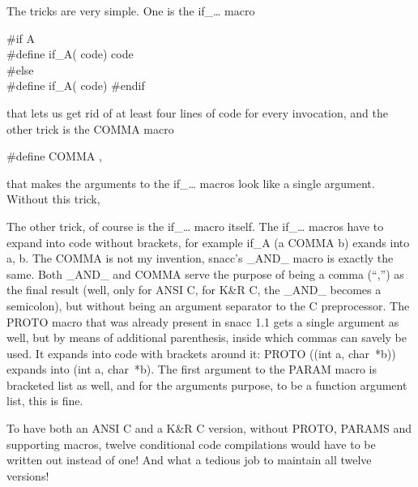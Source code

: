 The tricks are very simple.
One is the {\C if\_\dots} macro

\begin{Ccode}
\#if A\\
\#define if\_A( code)			\>\>\>code\\
\#else\\
\#define if\_A( code)
\#endif
\end{Ccode}

that lets us get rid of at least four lines of code for every invocation, and the other trick is the {\C COMMA} macro

\begin{Ccode}
\#define COMMA \>\>\>,
\end{Ccode}

that makes the arguments to the {\C if\_\dots{}} macros look like a single argument.
Without this trick, 

The other trick, of course is the {\C if\_\dots{}} macro itself.
The {\C if\_\dots{}} macros have to expand into code without brackets, for example {\C if\_A (a COMMA b)} exands into {\C a, b}.
The {\C COMMA} is not my invention, snacc's {\C \_AND\_} macro is exactly the same.
Both {\C \_AND\_} and {\C COMMA} serve the purpose of being a comma (``,'') as the final result (well, only for ANSI C, for K\&R C, the {\C \_AND\_} becomes a semicolon), but without being an argument separator to the C preprocessor.
The {\C PROTO} macro that was already present in snacc 1.1 gets a single argument as well, but by means of additional parenthesis, inside which commas can savely be used.
It expands into code with brackets around it: {\C PROTO ((int a, char~*b))} expands into {\C (int a, char~*b)}.
The first argument to the {\C PARAM} macro is bracketed list as well, and for the arguments purpose, to be a function argument list, this is fine.

To have both an ANSI C and a K\&R C version, without {\C PROTO}, {\C PARAMS} and supporting macros, twelve conditional code compilations would have to be written out instead of one!
And what a tedious job to maintain all twelve versions!
